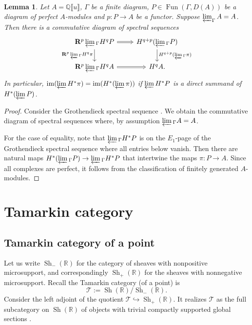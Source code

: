 \documentclass[11pt]{amsart}
\numberwithin{equation}{section}
\theoremstyle{plain}
\newtheorem{Lemma}[lemma]{Lemma}
\theoremstyle{definition}
\theoremstyle{remark}
\newcommand{\bQ} { {\mathbb{Q}}}
\newcommand{\bR} { {\mathbb{R}}}
\newcommand{\sT} { {\mathscr{T}}}
\newcommand{\fpw}[1]{{\llbracket #1\rrbracket}}
\newcommand{\Sh} { {\operatorname{Sh}}}
\newcommand\Fun{\operatorname{Fun}}
\newcommand\im{ {\operatorname{im}} }
\begin{document}
\begin{Lemma}\label{lem: finite lim index}
Let $A = \bQ\fpw{u}$, $\Gamma$ be a finite diagram, $P \in \Fun(\Gamma, D(A))$ be a diagram of perfect $A$-modules and $p: P \to A$ be a functor. Suppose $\varprojlim_{\Gamma}A = A$. Then there is a commutative diagram of spectral sequences
\[\begin{tikzcd}
\mathbf{R}^p\varprojlim{}_{\Gamma}H^{q}P \ar[r,Rightarrow] \ar[d, "\mathbf{R}^p\varprojlim{}_{\Gamma}H^{q}\pi" left] & H^{q+p}(\varprojlim{}_{\Gamma}P) \ar[d, "H^{q+p}(\varprojlim{}_{\Gamma}\pi)"] \\
\mathbf{R}^p\varprojlim{}_{\Gamma}H^{q}A \ar[r, Rightarrow] & H^{q}A.
\end{tikzcd}\]
In particular, $\im(\varprojlim H^*\pi) = \im(H^*(\varprojlim \pi))$ if $\varprojlim{}H^*P$ is a direct summand of $H^*(\varprojlim{}P)$.
\end{Lemma}
\begin{proof}
Consider the Grothendieck spectral sequence \cite[Tag 015N]{StacksProject}. We obtain the commutative diagram of spectral sequences where, by assumption $\varprojlim{}_\Gamma A = A$.

For the case of equality, note that $\varprojlim{}_\Gamma H^*P$ is on the $E_1$-page of the Grothendieck spectral sequence where all entries below vanish. Then there are natural maps $H^*(\varprojlim{}_\Gamma P) \to \varprojlim{}_\Gamma H^*P$ that intertwine the maps $\pi: P \to A$. Since all complexes are perfect, it follows from the classification of finitely generated $A$-modules. 
\end{proof}

\section{Tamarkin category}

\subsection{Tamarkin category of a point}
\label{Tamarkin point}

Let us write $\Sh_-(\bR)$ for the category of sheaves with nonpositive microsupport, and correspondingly $\Sh_+(\bR)$ for the sheaves with nonnegative microsupport. Recall the Tamarkin category (of a point) is
\[\sT := \Sh(\bR) / \Sh_-(\bR).\]
Consider the left adjoint of the quotient $\sT \hookrightarrow \Sh_+(\bR)$. It realizes $\sT$ as the full subcategory on $\Sh(\bR)$ of objects with trivial compactly supported global sections \cite[Proposition 4.2]{Hochschild-Kuo-Shende-Zhang}. 
\end{document}
